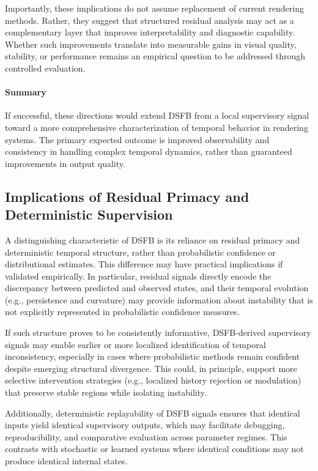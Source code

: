 \documentclass[11pt,letterpaper]{article}
\theoremstyle{gcresult}
\theoremstyle{definition}
\begin{document}
Importantly, these implications do not assume replacement of current rendering methods. Rather, they suggest that structured residual analysis may act as a complementary layer that improves interpretability and diagnostic capability. Whether such improvements translate into measurable gains in visual quality, stability, or performance remains an empirical question to be addressed through controlled evaluation.

\paragraph{Summary}
If successful, these directions would extend DSFB from a local supervisory signal toward a more comprehensive characterization of temporal behavior in rendering systems. The primary expected outcome is improved observability and consistency in handling complex temporal dynamics, rather than guaranteed improvements in output quality.


\subsection{Implications of Residual Primacy and Deterministic Supervision}

A distinguishing characteristic of DSFB is its reliance on residual primacy and deterministic temporal structure, rather than probabilistic confidence or distributional estimates. This difference may have practical implications if validated empirically. In particular, residual signals directly encode the discrepancy between predicted and observed states, and their temporal evolution (e.g., persistence and curvature) may provide information about instability that is not explicitly represented in probabilistic confidence measures.

If such structure proves to be consistently informative, DSFB-derived supervisory signals may enable earlier or more localized identification of temporal inconsistency, especially in cases where probabilistic methods remain confident despite emerging structural divergence. This could, in principle, support more selective intervention strategies (e.g., localized history rejection or modulation) that preserve stable regions while isolating instability.

Additionally, deterministic replayability of DSFB signals ensures that identical inputs yield identical supervisory outputs, which may facilitate debugging, reproducibility, and comparative evaluation across parameter regimes. This contrasts with stochastic or learned systems where identical conditions may not produce identical internal states.
\end{document}
